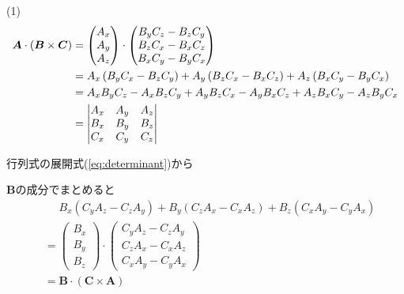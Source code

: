 \documentclass[a4paper,12pt]{jlreq}
\begin{document}

(1)
\begin{align}
    \bm{A}\cdot\left(\bm{B}\times\bm{C}\right) & =\begin{pmatrix}A_x\\A_y\\A_z\end{pmatrix}\cdot\begin{pmatrix}B_yC_z-B_zC_y\\B_zC_x-B_xC_z\\B_xC_y-B_yC_x\end{pmatrix}\notag \\
                                               & =A_x\left(B_yC_x-B_zC_y\right)+A_y\left(B_zC_x-B_xC_z\right)+A_z\left(B_xC_y-B_yC_x\right)\notag                             \\
                                               & =A_xB_yC_z-A_xB_zC_y+A_yB_zC_x-A_yB_xC_z+A_zB_xC_y-A_zB_yC_x\label{eq:determinant}                                           \\
                                               & =\begin{vmatrix}A_x&A_y&A_z\\B_x&B_y&B_z\\C_x&C_y&C_z\end{vmatrix}\notag
\end{align}

行列式の展開式(\ref{eq:determinant})から

\(\bm{B}\)の成分でまとめると
\begin{align*}
     & \phantom{{}={}} B_x\left(C_yA_z-C_zA_y\right)+B_y\left(C_zA_x-C_xA_z\right)+B_z\left(C_xA_y-C_yA_x\right)              \\
     & =\begin{pmatrix}B_x\\B_y\\B_z\end{pmatrix}\cdot\begin{pmatrix}C_yA_z-C_zA_y\\C_zA_x-C_xA_z\\C_xA_y-C_yA_x\end{pmatrix} \\
     & =\bm{B}\cdot\left(\bm{C}\times\bm{A}\right)
\end{align*}
\end{document}
